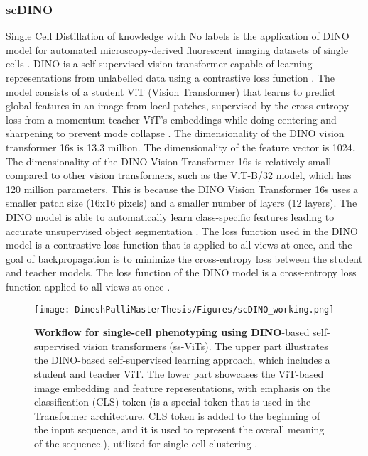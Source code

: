 \documentclass[12pt,a4paper]{article}
\begin{document}
\subsubsection{scDINO}
Single Cell Distillation of knowledge with No labels is the application of DINO model for automated microscopy-derived fluorescent imaging datasets of single cells \cite{Pfaendler2023.01.16.524226}. DINO is a self-supervised vision transformer capable of learning representations from unlabelled data using a contrastive loss function \cite{Pfaendler2023.01.16.524226}. The model consists of a student ViT (Vision Transformer) that learns to predict global features in an image from local patches, supervised by the cross-entropy loss from a momentum teacher ViT's embeddings while doing centering and sharpening to prevent mode collapse \cite{Pfaendler2023.01.16.524226}. The dimensionality of the DINO vision transformer 16s is 13.3 million. The dimensionality of the feature vector is 1024. The dimensionality of the DINO Vision Transformer 16s is relatively small compared to other vision transformers, such as the ViT-B/32 model, which has 120 million parameters. This is because the DINO Vision Transformer 16s uses a smaller patch size (16x16 pixels) and a smaller number of layers (12 layers). The DINO model is able to automatically learn class-specific features leading to accurate unsupervised object segmentation \cite{Pfaendler2023.01.16.524226}. The loss function used in the DINO model is a contrastive loss function that is applied to all views at once, and the goal of backpropagation is to minimize the cross-entropy loss between the student and teacher models. The loss function of the DINO model is a cross-entropy loss function applied to all views at once \cite{Pfaendler2023.01.16.524226}.

\begin{figure}
  \centering
  \texttt{[image: DineshPalliMasterThesis/Figures/scDINO\_working.png]}
  \caption[Workflow of scDINO]{\textbf{Workflow for single-cell phenotyping using DINO}-based self-supervised vision transformers (ss-ViTs). The upper part illustrates the DINO-based self-supervised learning approach, which includes a student and teacher ViT. The lower part showcases the ViT-based image embedding and feature representations, with emphasis on the classification (CLS) token (is a special token that is used in the Transformer architecture. CLS token is added to the beginning of the input sequence, and it is used to represent the overall meaning of the sequence.), utilized for single-cell clustering \cite{Pfaendler2023.01.16.524226}.}
  \label{scdinoworking}
\end{figure}
\end{document}
